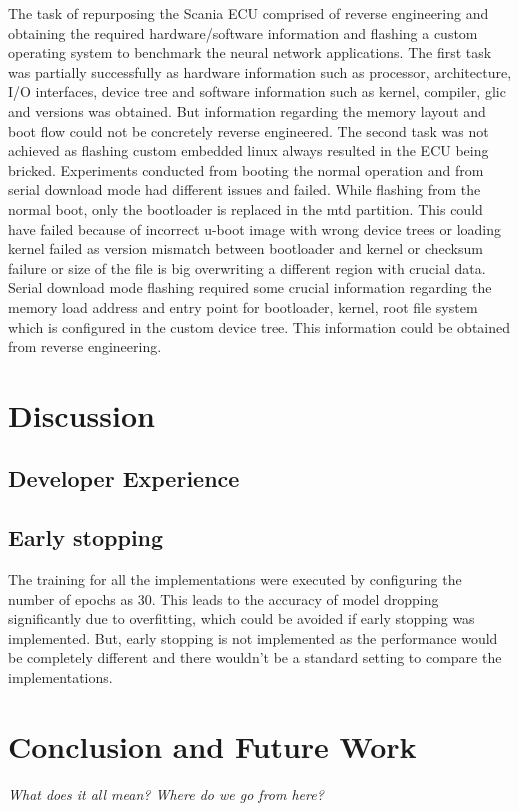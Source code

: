 The task of repurposing the Scania ECU comprised of reverse engineering and obtaining the required hardware/software information and flashing a custom operating system to benchmark the neural network applications. 
The first task was partially successfully as hardware information such as processor, architecture, I/O interfaces, device tree and software information such as kernel, compiler, glic and versions was obtained. But information regarding the memory layout and boot flow could not be concretely reverse engineered. 
The second task was not achieved as flashing custom embedded linux always resulted in the ECU being bricked. Experiments conducted from booting the normal operation and from serial download mode had different issues and failed. While flashing from the normal boot, only the bootloader is replaced in the mtd partition. This could have failed because of incorrect u-boot image with wrong device trees or loading kernel failed as version mismatch between bootloader and kernel or checksum failure or size of the file is big overwriting a different region with crucial data. Serial download mode flashing required some crucial information regarding the memory load address and entry point for bootloader, kernel, root file system which is configured in the custom device tree. This information could be obtained from reverse engineering. 




\chapter{Discussion}


\section{Developer Experience}

\section{Early stopping}
The training for all the implementations were executed by configuring the number of epochs as 30. This leads to the accuracy of model dropping significantly due to overfitting, which could be avoided if early stopping was implemented.
But, early stopping is not implemented as the performance would be completely different and there wouldn't be a standard setting to compare the implementations.

\chapter{Conclusion and Future Work}
\textit{What does it all mean? Where do we go from here?}
